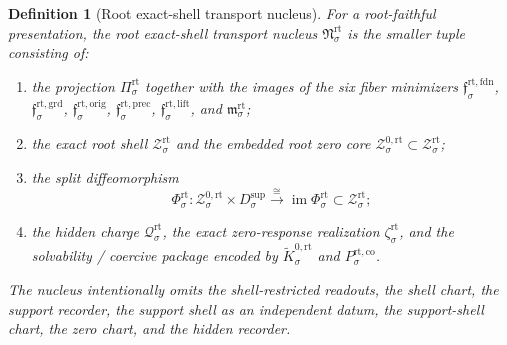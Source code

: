 \documentclass[11pt]{article}
\newcommand{\RootProj}[1]{\Pi_{#1}^{\mathrm{rt}}}
\newcommand{\RootFoundMin}[1]{\mathfrak f_{#1}^{\mathrm{rt,fdn}}}
\newcommand{\RootGroundMin}[1]{\mathfrak f_{#1}^{\mathrm{rt,grd}}}
\newcommand{\RootOrigMin}[1]{\mathfrak f_{#1}^{\mathrm{rt,orig}}}
\newcommand{\RootPrecMin}[1]{\mathfrak f_{#1}^{\mathrm{rt,prec}}}
\newcommand{\RootLiftMin}[1]{\mathfrak f_{#1}^{\mathrm{rt,lift}}}
\newcommand{\RootSubMin}[1]{\mathfrak m_{#1}^{\mathrm{rt}}}
\newcommand{\RootShellSet}[1]{\mathcal Z_{#1}^{\mathrm{rt}}}
\newcommand{\RootZeroCore}[1]{\mathcal Z_{#1}^{0,\mathrm{rt}}}
\newcommand{\RootSplit}[1]{\Phi_{#1}^{\mathrm{rt}}}
\newcommand{\RootCharge}[1]{\mathcal Q_{#1}^{\mathrm{rt}}}
\newcommand{\RootEmbed}[1]{\zeta_{#1}^{\mathrm{rt}}}
\newcommand{\RootKernelCh}[1]{\widetilde K_{#1}^{0,\mathrm{rt}}}
\newcommand{\RootStateComp}[1]{P_{#1}^{\mathrm{rt,co}}}
\newcommand{\SeedHiddenBody}[1]{D_{#1}^{\mathrm{sup}}}
\newcommand{\RootNucleus}[1]{\mathfrak N_{#1}^{\mathrm{rt}}}
\newtheorem{definition}{Definition}
\begin{document}
\begin{definition}[Root exact-shell transport nucleus]
\label{def:nucleus}
For a root-faithful presentation, the \emph{root exact-shell transport nucleus} \(\RootNucleus{\sigma}\) is the smaller tuple consisting of:
\begin{enumerate}
    \item the projection \(\RootProj{\sigma}\) together with the images of the six fiber minimizers \(\RootFoundMin{\sigma}\), \(\RootGroundMin{\sigma}\), \(\RootOrigMin{\sigma}\), \(\RootPrecMin{\sigma}\), \(\RootLiftMin{\sigma}\), and \(\RootSubMin{\sigma}\);
    \item the exact root shell \(\RootShellSet{\sigma}\) and the embedded root zero core \(\RootZeroCore{\sigma}\subset\RootShellSet{\sigma}\);
    \item the split diffeomorphism
    \[
    \RootSplit{\sigma}:
    \RootZeroCore{\sigma}\times\SeedHiddenBody{\sigma}
    \xrightarrow{\cong}
    \operatorname{im}\RootSplit{\sigma}\subset\RootShellSet{\sigma};
    \]
    \item the hidden charge \(\RootCharge{\sigma}\), the exact zero-response realization \(\RootEmbed{\sigma}\), and the solvability / coercive package encoded by \(\RootKernelCh{\sigma}\) and \(\RootStateComp{\sigma}\).
\end{enumerate}
The nucleus intentionally omits the shell-restricted readouts, the shell chart, the support recorder, the support shell as an independent datum, the support-shell chart, the zero chart, and the hidden recorder.
\end{definition}
\end{document}
